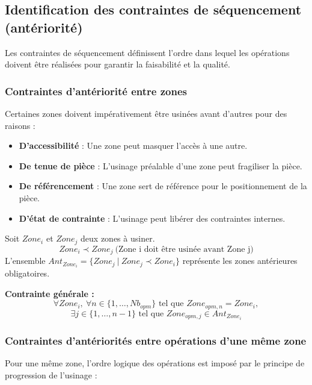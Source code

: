 \documentclass{article}
\begin{document}
\subsection{Identification des contraintes de séquencement (antériorité)}

Les contraintes de séquencement définissent l'ordre dans lequel les opérations doivent être réalisées pour garantir la faisabilité et la qualité.

\subsubsection{Contraintes d'antériorité entre zones}

Certaines zones doivent impérativement être usinées avant d'autres pour des raisons :

\begin{itemize}
    \item \textbf{D'accessibilité} : Une zone peut masquer l'accès à une autre.
    \item \textbf{De tenue de pièce} : L'usinage préalable d'une zone peut fragiliser la pièce.
    \item \textbf{De référencement} : Une zone sert de référence pour le positionnement de la pièce.
    \item \textbf{D'état de contrainte} : L'usinage peut libérer des contraintes internes.
\end{itemize}

\begin{tcolorbox}[colback=blue!5!white, colframe=blue!75!black, title=Formalisation des contraintes d'antériorité]
Soit $Zone_i$ et $Zone_j$ deux zones à usiner.
\[
Zone_i \prec Zone_j \ \text{(Zone i doit être usinée avant Zone j)}
\]
L'ensemble $Ant_{Zone_i} = \{ Zone_j \ | \ Zone_j \prec Zone_i \}$ représente les zones antérieures obligatoires.

\textbf{Contrainte générale :}
\[
\forall Zone_i, \ \forall n \in \{1,\dots,Nb_{opm}\} \text{ tel que } Zone_{opm,n} = Zone_i,
\]
\[
\exists j \in \{1,\dots,n-1\} \text{ tel que } Zone_{opm,j} \in Ant_{Zone_i}
\]
\end{tcolorbox}

\subsubsection{Contraintes d'antériorités entre opérations d'une même zone}

Pour une même zone, l'ordre logique des opérations est imposé par le principe de progression de l'usinage :
\end{document}
